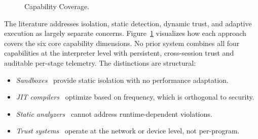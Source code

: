 \documentclass[conference]{IEEEtran}
\begin{document}
\begin{figure}[t]
\caption{Capability Coverage.}
\label{fig:capability_coverage}
\end{figure}

The literature addresses isolation, static detection, dynamic
trust, and adaptive execution as largely separate concerns.
Figure~\ref{fig:capability_coverage} visualizes how each
approach covers the six core capability dimensions.  No prior
system combines all four capabilities at the interpreter level
with persistent, cross-session trust and auditable per-stage
telemetry.  The distinctions are structural:

\begin{itemize}[nosep]
  \item \emph{Sandboxes}~\cite{johnson2023wave,menetrey2024sgx}
    provide static isolation with no performance adaptation.
  \item \emph{JIT compilers}~\cite{qin2022jit_security} optimize
    based on frequency, which is orthogonal to security.
  \item \emph{Static analyzers}~\cite{ami2024false_neg,huang2024static}
    cannot address runtime-dependent violations.
  \item \emph{Trust systems}~\cite{wang2022trust,ullah2024deeptrust}
    operate at the network or device level, not per-program.
\end{itemize}
\end{document}
